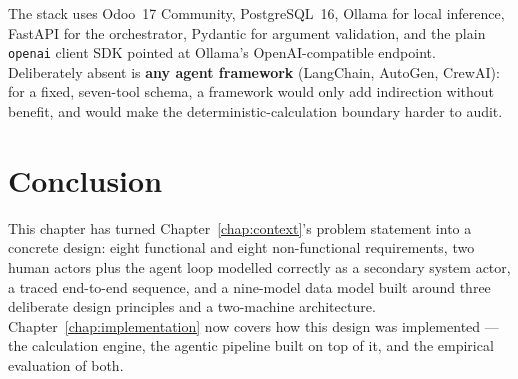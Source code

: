 The stack uses Odoo~17 Community, PostgreSQL~16, Ollama for local
inference, FastAPI for the orchestrator, Pydantic for argument validation,
and the plain \texttt{openai} client SDK pointed at Ollama's
OpenAI-compatible endpoint. Deliberately absent is \textbf{any agent
framework} (LangChain, AutoGen, CrewAI): for a fixed, seven-tool schema, a
framework would only add indirection without benefit, and would make the
deterministic-calculation boundary harder to audit.

\section{Conclusion}

This chapter has turned Chapter~\ref{chap:context}'s problem statement
into a concrete design: eight functional and eight non-functional
requirements, two human actors plus the agent loop modelled correctly as
a secondary system actor, a traced end-to-end sequence, and a nine-model
data model built around three deliberate design principles and a
two-machine architecture. Chapter~\ref{chap:implementation} now covers
how this design was implemented --- the calculation engine, the agentic
pipeline built on top of it, and the empirical evaluation of both.
